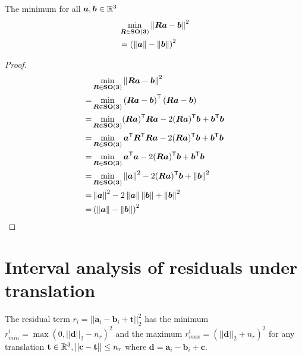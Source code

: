 \clearpage
\setcounter{page}{1}
\maketitlesupplementary



\begin{lemma}\label{lemma:ls-rot}
	The minimum for all $\boldsymbol{a}, \boldsymbol{b} \in \mathbb{R}^3$
	\begin{equation}
		\begin{aligned}
			&\min_{{\bm R} \in \mathbf{SO(3)}} \left\|{\bm R} \boldsymbol{a} - \boldsymbol{b}\right\|^2\\
			&= \left( \left\| \boldsymbol{a} \right\| - \left\| \boldsymbol{b} \right\| \right)^2
		\end{aligned}
	\end{equation}
\end{lemma}

\begin{proof}
\begin{equation}
	\begin{aligned}
		&\min_{{\bm R} \in \mathbf{SO(3)}} \left\|{\bm R} \boldsymbol{a} - \boldsymbol{b}\right\|^2\\
		=&\min_{{\bm R} \in \mathbf{SO(3)}} \left( {\bm R} \boldsymbol{a} - \boldsymbol{b} \right)^{\mathsf{T}} \left( {\bm R} \boldsymbol{a} - \boldsymbol{b} \right)\\
		=&\min_{{\bm R} \in \mathbf{SO(3)}} ({\bm R}\boldsymbol{a})^{\mathsf{T}} {\bm R}\boldsymbol{a} - 2 ({\bm R} \boldsymbol{a})^{\mathsf{T}} \boldsymbol{b} + \boldsymbol{b}^{\mathsf{T}} \boldsymbol{b}\\
		=&\min_{{\bm R} \in \mathbf{SO(3)}} \boldsymbol{a}^{\mathsf{T}} {\bm R}^{\mathsf{T}} {\bm R} \boldsymbol{a} - 2 ({\bm R} \boldsymbol{a})^{\mathsf{T}} \boldsymbol{b} + \boldsymbol{b}^{\mathsf{T}} \boldsymbol{b}\\
		=&\min_{{\bm R} \in \mathbf{SO(3)}} \boldsymbol{a}^{\mathsf{T}} \boldsymbol{a} - 2 ({\bm R} \boldsymbol{a})^{\mathsf{T}} \boldsymbol{b} + \boldsymbol{b}^{\mathsf{T}} \boldsymbol{b}\\
		=&\min_{{\bm R} \in \mathbf{SO(3)}} \left\|\boldsymbol{a}\right\|^2 - 2 ({\bm R} \boldsymbol{a})^{\mathsf{T}} \boldsymbol{b}  + \left\|\boldsymbol{b}\right\|^2\\
		=& \left\|\boldsymbol{a}\right\|^2 - 2 \left\| \boldsymbol{a} \right\| \left\| \boldsymbol{b} \right\|  + \left\|\boldsymbol{b}\right\|^2\\
		=& \left( \left\| \boldsymbol{a} \right\| - \left\| \boldsymbol{b} \right\| \right)^2
	\end{aligned}
\end{equation}
	
\end{proof}



\section{Interval analysis of residuals under translation}
\label{proof:tls-relax-minmax-r}

\begin{theorem}
	The residual term $r_i = ||\mathbf{a}_i - \mathbf{b}_i + \mathbf{t}||_2^2$
	has the minimum $r_{min}^i = \max(0, ||\mathbf{d}||_2 - n_r)^2$ and the maximum $r_{max}^i = (||\mathbf{d}||_2 + n_r)^2$
	for any translation $\mathbf{t} \in \mathbb{R}^3, ||\mathbf{c} - \mathbf{t}|| \leq n_r$ where $\mathbf{d} = \mathbf{a}_i - \mathbf{b}_i + \mathbf{c}$.
\end{theorem}

